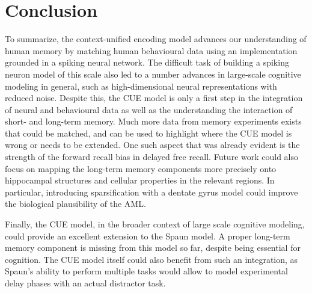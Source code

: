 \chapter{Conclusion}
To summarize, the context-unified encoding model advances our understanding of human memory by matching human behavioural data using an implementation grounded in a spiking neural network.
The difficult task of building a spiking neuron model of this scale also led to a number advances in large-scale cognitive modeling in general, such as high-dimensional neural representations with reduced noise.
Despite this, the CUE model is only a first step in the integration of neural and behavioural data as well as the understanding the interaction of short- and long-term memory.
Much more data from memory experiments exists that could be matched, and can be used to highlight where the CUE model is wrong or needs to be extended.
One such aspect that was already evident is the strength of the forward recall bias in delayed free recall.
Future work could also focus on mapping the long-term memory components more precisely onto hippocampal structures and cellular properties in the relevant regions.
In particular, introducing sparsification with a dentate gyrus model could improve the biological plausibility of the AML\@.

Finally, the CUE model, in the broader context of large scale cognitive modeling, could provide an excellent extension to the Spaun model.
A proper long-term memory component is missing from this model so far, despite being essential for cognition.
The CUE model itself could also benefit from such an integration, as Spaun's ability to perform multiple tasks would allow to model experimental delay phases with an actual distractor task.
